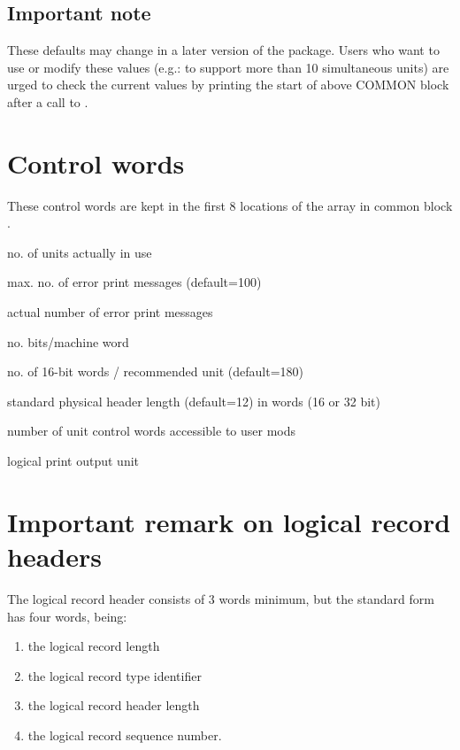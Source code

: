\subsection*{Important note}
 
These defaults may change in a later version of the package. Users who
want to use or modify these values (e.g.: to support more than 10
simultaneous units) are urged to check the current values by printing
the start of above COMMON block after a call to .

\section{Control words}

These control words are kept in the first 8 locations of the
array  in common block .

\begin{DLtt}{1}
\item[1] no. of units actually in use
\item[2] max. no. of error print messages (default=100)
\item[3] actual number of error print messages
\item[4] no. bits/machine word
\item[5] no. of 16-bit words / recommended unit (default=180)
\item[6] standard physical header length (default=12) in words (16 or 32 bit)
\item[7] number of unit control words accessible to user mods
\item[8] logical print output unit
\end{DLtt}

\newpage

\section{Important remark on logical record headers}
\label{sec:remarkslogicalrecords}

The logical record header consists of 3 words minimum, but the
standard form has four words, being:

\begin{enumerate}
\item the logical record length
\item the logical record type identifier
\item the logical record header length
\item the logical record sequence number.
\end{enumerate}
 
